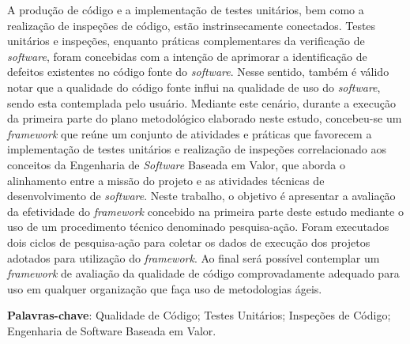 \begin{resumo}
 
 A produção de código e a implementação de testes unitários, bem como a realização de inspeções de código, estão instrinsecamente conectados. Testes unitários e inspeções, enquanto práticas complementares da verificação de \textit{software}, foram concebidas com a intenção de aprimorar a identificação de defeitos existentes no código fonte do \textit{software}. Nesse sentido, também é válido notar que a qualidade do código fonte influi na qualidade de uso do \textit{software}, sendo esta contemplada pelo usuário. Mediante este cenário, durante a execução da primeira parte do plano metodológico elaborado neste estudo, concebeu-se um \textit{framework} que reúne um conjunto de atividades e práticas que favorecem a implementação de testes unitários e realização de inspeções correlacionado aos conceitos da Engenharia de \textit{Software} Baseada em Valor, que aborda o alinhamento entre a missão do projeto e as atividades técnicas de desenvolvimento de \textit{software}. Neste trabalho, o objetivo é apresentar a avaliação da efetividade do \textit{framework} concebido na primeira parte deste estudo mediante o uso de um procedimento técnico denominado pesquisa-ação. Foram executados dois ciclos de pesquisa-ação para coletar os dados de execução dos projetos adotados para utilização do \textit{framework}. Ao final será possível contemplar um \textit{framework} de avaliação da qualidade de código comprovadamente adequado para uso em qualquer organização que faça uso de metodologias ágeis.

 \vspace{\onelineskip}
    
 \noindent
 \textbf{Palavras-chave}: Qualidade de Código; Testes Unitários; Inspeções de Código; Engenharia de Software Baseada em Valor.
\end{resumo}
